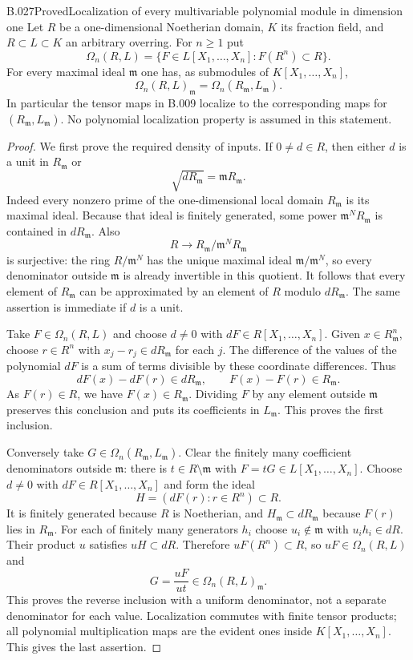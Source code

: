 \begin{saresult}{B.027}{Proved}{Localization of every multivariable polynomial module in dimension one}
Let $R$ be a one-dimensional Noetherian domain, $K$ its fraction
field, and $R\subset L\subset K$ an arbitrary overring. For
$n\ge1$ put
\[
 \Omega_n(R,L)=\{F\in L[X_1,\ldots,X_n]:F(R^n)\subset R\}.
\]
For every maximal ideal $\mathfrak m$ one has, as submodules of
$K[X_1,\ldots,X_n]$,
\[
 \Omega_n(R,L)_{\mathfrak m}
   =\Omega_n(R_{\mathfrak m},L_{\mathfrak m}).
\]
In particular the tensor maps in B.009 localize to the corresponding
maps for $(R_{\mathfrak m},L_{\mathfrak m})$. No polynomial
localization property is assumed in this statement.
\end{saresult}
\begin{proof}
We first prove the required density of inputs. If $0\ne d\in R$,
then either $d$ is a unit in $R_{\mathfrak m}$ or
\[
 \sqrt{dR_{\mathfrak m}}=\mathfrak mR_{\mathfrak m}.
\]
Indeed every nonzero prime of the one-dimensional local domain
$R_{\mathfrak m}$ is its maximal ideal. Because that ideal is
finitely generated, some power
$\mathfrak m^NR_{\mathfrak m}$ is contained in
$dR_{\mathfrak m}$. Also
\[
 R\longrightarrow R_{\mathfrak m}/\mathfrak m^NR_{\mathfrak m}
\]
is surjective: the ring $R/\mathfrak m^N$ has the unique maximal
ideal $\mathfrak m/\mathfrak m^N$, so every denominator outside
$\mathfrak m$ is already invertible in this quotient.
It follows that every element of $R_{\mathfrak m}$ can be
approximated by an element of $R$ modulo $dR_{\mathfrak m}$.
The same assertion is immediate if $d$ is a unit.

Take $F\in\Omega_n(R,L)$ and choose $d\ne0$ with
$dF\in R[X_1,\ldots,X_n]$. Given
$x\in R_{\mathfrak m}^n$, choose $r\in R^n$ with
$x_j-r_j\in dR_{\mathfrak m}$ for each $j$.
The difference of the values of the polynomial $dF$ is a sum
of terms divisible by these coordinate differences. Thus
\[
 dF(x)-dF(r)\in dR_{\mathfrak m},
 \qquad F(x)-F(r)\in R_{\mathfrak m}.
\]
As $F(r)\in R$, we have $F(x)\in R_{\mathfrak m}$.
Dividing $F$ by any element outside $\mathfrak m$ preserves this
conclusion and puts its coefficients in $L_{\mathfrak m}$.
This proves the first inclusion.

Conversely take
$G\in\Omega_n(R_{\mathfrak m},L_{\mathfrak m})$.
Clear the finitely many coefficient denominators outside
$\mathfrak m$: there is $t\in R\setminus\mathfrak m$ with
$F=tG\in L[X_1,\ldots,X_n]$. Choose $d\ne0$ with
$dF\in R[X_1,\ldots,X_n]$ and form the ideal
\[
 H=(dF(r):r\in R^n)\subset R.
\]
It is finitely generated because $R$ is Noetherian, and
$H_{\mathfrak m}\subset dR_{\mathfrak m}$ because $F(r)$ lies
in $R_{\mathfrak m}$. For each of finitely many generators
$h_i$ choose $u_i\notin\mathfrak m$ with $u_i h_i\in dR$.
Their product $u$ satisfies $uH\subset dR$. Therefore
$uF(R^n)\subset R$, so $uF\in\Omega_n(R,L)$ and
\[
 G=\frac{uF}{ut}\in\Omega_n(R,L)_{\mathfrak m}.
\]
This proves the reverse inclusion with a uniform denominator,
not a separate denominator for each value. Localization commutes
with finite tensor products; all polynomial multiplication maps
are the evident ones inside $K[X_1,\ldots,X_n]$. This gives the
last assertion.
\end{proof}

